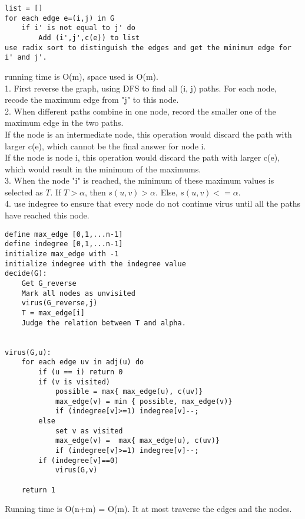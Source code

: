 \documentclass[12pt,a4paper]{article}
\newcommand{\question}[1]{\bigskip\noindent{\textbf{Q{#1} solution}}}
\begin{document}
\begin{lstlisting}
list = []
for each edge e=(i,j) in G
	if i' is not equal to j' do 
		Add (i',j',c(e)) to list
use radix sort to distinguish the edges and get the minimum edge for i' and j'.
\end{lstlisting}
running time is O(m), space used is O(m).\\
\question{28.B}
1. First reverse the graph, using DFS to find all (i, j) paths. For each node, recode the maximum edge from "j" to this node. \\
2. When different paths combine in one node, record the smaller one of the maximum edge in the two paths. \\
If the node is an intermediate node, this operation would discard the path with larger c(e), which cannot be the final answer for node i.\\
If the node is node i, this operation would discard the path with larger c(e), which would result in the minimum of the maximums.\\
3. When the node "i" is reached, the minimum of these maximum values is selected as $T$. If $T> \alpha$, then $s(u,v)> \alpha$. Else, $s(u,v)<= \alpha$.\\
4. use indegree to ensure that every node do not continue virus until all the paths have reached this node.\\
\begin{lstlisting}
define max_edge [0,1,...n-1]
define indegree [0,1,...n-1]
initialize max_edge with -1
initialize indegree with the indegree value
decide(G):
	Get G_reverse
	Mark all nodes as unvisited
	virus(G_reverse,j)
	T = max_edge[i]
	Judge the relation between T and alpha.
	

virus(G,u):
	for each edge uv in adj(u) do
		if (u == i) return 0
		if (v is visited)
			possible = max{ max_edge(u), c(uv)}
			max_edge(v) = min { possible, max_edge(v)} 
			if (indegree[v]>=1) indegree[v]--;
		else
			set v as visited
			max_edge(v) =  max{ max_edge(u), c(uv)}
			if (indegree[v]>=1) indegree[v]--;
		if (indegree[v]==0)
			virus(G,v)

	return 1
\end{lstlisting}
Running time is O(n+m) = O(m). It at most traverse the edges and the nodes.
\end{document}
